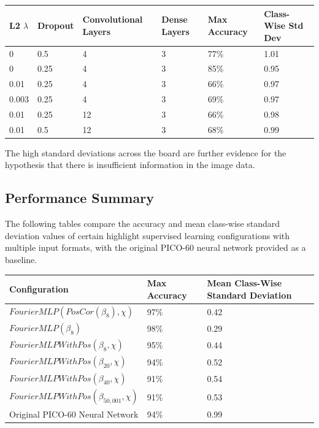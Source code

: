 \documentclass[10pt]{article}
\begin{document}
\begin{center}
    \begin{tabular}{|l|l|l|l|l|l|}
        \hline
        L2 $\lambda$ & Dropout & Convolutional Layers & Dense Layers & Max Accuracy & Class-Wise Std Dev \\
        \hline
        0 & 0.5 & 4 & 3 & 77\% & 1.01 \\
        \hline
        0 & 0.25 & 4 & 3 & 85\% & 0.95 \\
        \hline
        0.01 & 0.25 & 4 & 3 & 66\% & 0.97 \\
        \hline
        0.003 & 0.25 & 4 & 3 & 69\% & 0.97 \\
        \hline
        0.01 & 0.25 & 12 & 3 & 66\% & 0.98 \\
        \hline
        0.01 & 0.5 & 12 & 3 & 68\% & 0.99 \\
        \hline
    \end{tabular}
\end{center}

The high standard deviations across the board are further evidence for the hypothesis that there is insufficient information in the image data.

\subsection{Performance Summary}

The following tables compare the accuracy and mean class-wise standard deviation values of certain highlight supervised learning configurations with multiple input formats, with the original PICO-60 neural network provided as a baseline.

\begin{minipage}{\textwidth}
    \begin{center}
        \begin{tabular}{|l|l|l|}
            \hline
            Configuration & Max Accuracy & Mean Class-Wise Standard Deviation \\
            \hline
            $FourierMLP(PosCor(\beta_{8}), \chi)$ & 97\% & 0.42 \\
            \hline
            $FourierMLP(\beta_{8})$ & 98\% & 0.29 \\
            \hline
            $FourierMLPWithPos(\beta_{8}, \chi)$ & 95\% & 0.44 \\
            \hline
            $FourierMLPWithPos(\beta_{20}, \chi)$ & 94\% & 0.52 \\
            \hline
            $FourierMLPWithPos(\beta_{40}, \chi)$ & 91\% & 0.54 \\
            \hline
            $FourierMLPWithPos(\beta_{50,001}, \chi)$ & 91\% & 0.53 \\
            \hline
            Original PICO-60 Neural Network & 94\% & 0.99 \\
            \hline
        \end{tabular}
    \end{center}
\end{minipage}
\end{document}
